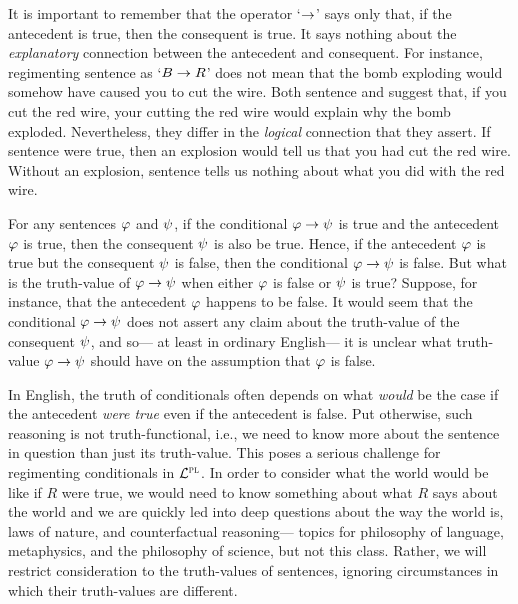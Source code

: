 It is important to remember that the operator `$\rightarrow$' says only that, if the antecedent is true, then the consequent is true.
It says nothing about the \emph{explanatory} connection between the antecedent and consequent.
For instance, regimenting sentence  as `$B \rightarrow R$' does not mean that the bomb exploding would somehow have caused you to cut the wire.
Both sentence  and  suggest that, if you cut the red wire, your cutting the red wire would explain why the bomb exploded.
Nevertheless, they differ in the \textit{logical} connection that they assert.
If sentence  were true, then an explosion would tell us that you had cut the red wire.
Without an explosion, sentence  tells us nothing about what you did with the red wire.



For any sentences $\varphi$ and $\psi$, if the conditional $\varphi \rightarrow \psi$ is true and the antecedent $\varphi$ is true, then the consequent $\psi$ is also be true.
Hence, if the antecedent $\varphi$ is true but the consequent $\psi$ is false, then the conditional $\varphi \rightarrow \psi$ is false.
But what is the truth-value of $\varphi \rightarrow \psi$ when either $\varphi$ is false or $\psi$ is true?
Suppose, for instance, that the antecedent $\varphi$ happens to be false.
It would seem that the conditional $\varphi \rightarrow \psi$ does not assert any claim about the truth-value of the consequent $\psi$, and so--- at least in ordinary English--- it is unclear what truth-value $\varphi \rightarrow \psi$ should have on the assumption that $\varphi$ is false.  

In English, the truth of conditionals often depends on what \emph{would} be the case if the antecedent \emph{were true} even if the antecedent is false.
Put otherwise, such reasoning is not truth-functional, i.e., we need to know more about the sentence in question than just its truth-value.
This poses a serious challenge for regimenting conditionals in $\mathcal{L}^{\textsc{pl}}$.
In order to consider what the world would be like if $R$ were true, we would need to know something about what $R$ says about the world and we are quickly led into deep questions about the way the world is, laws of nature, and counterfactual reasoning--- topics for philosophy of language, metaphysics, and the philosophy of science, but not this class.
Rather, we will restrict consideration to the truth-values of sentences, ignoring circumstances in which their truth-values are different.

